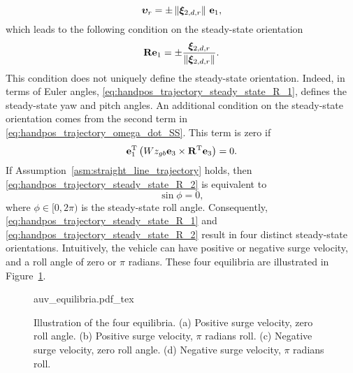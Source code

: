 \begin{equation}
    \bm{\upsilon}_r = \pm \left\|\bm{\xi}_{2, d, r}\right\|\,\mathbf{e}_1,
\end{equation}
which leads to the following condition on the steady-state orientation
\begin{equation}
    \mathbf{R} \mathbf{e}_1 = \pm \frac{\bm{\xi}_{2, d, r}}{\left\|\bm{\xi}_{2, d, r}\right\|}. \label{eq:handpos_trajectory_steady_state_R_1}
\end{equation}
This condition does not uniquely define the steady-state orientation.
Indeed, in terms of Euler angles, \eqref{eq:handpos_trajectory_steady_state_R_1}, defines the steady-state yaw and pitch angles.
An additional condition on the steady-state orientation comes from the second term in \eqref{eq:handpos_trajectory_omega_dot_SS}.
This term is zero if
\begin{equation}
    \mathbf{e}_1^{\mathrm{T}} \left(Wz_{gb} \mathbf{e}_3 \times \mathbf{R}^{\mathrm{T}} \mathbf{e}_3\right) = 0. \label{eq:handpos_trajectory_steady_state_R_2}
\end{equation}
If Assumption~\ref{asm:straight_line_trajectory} holds, then \eqref{eq:handpos_trajectory_steady_state_R_2} is equivalent to
\begin{equation}
    \sin\phi = 0,
\end{equation}
where $\phi \in [0, 2\pi)$ is the steady-state roll angle.
Consequently, \eqref{eq:handpos_trajectory_steady_state_R_1} and \eqref{eq:handpos_trajectory_steady_state_R_2} result in four distinct steady-state orientations.
Intuitively, the vehicle can have positive or negative surge velocity, and a roll angle of zero or $\pi$ radians.
These four equilibria are illustrated in Figure~\ref{fig:equilibria}.

\begin{figure}[tb]
    \centering
    \def\svgwidth{0.48\textwidth}
    {auv_equilibria.pdf_tex}
    \caption{Illustration of the four equilibria. (a) Positive surge velocity, zero roll angle. (b) Positive surge velocity, $\pi$ radians roll. (c) Negative surge velocity, zero roll angle. (d) Negative surge velocity, $\pi$ radians roll.}
    \label{fig:equilibria}
\end{figure}

